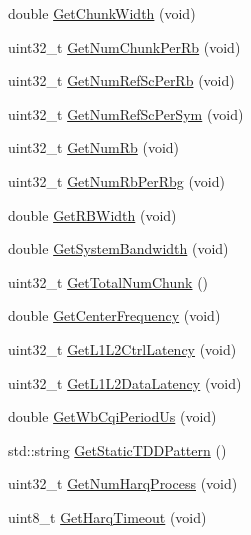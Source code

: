 \begin{DoxyCompactItemize}
\item 
double \hyperlink{classns3_1_1MmWavePhyMacCommon_acc801566d527f1893d67a618ea3be203}{Get\+Chunk\+Width} (void)
\item 
uint32\+\_\+t \hyperlink{classns3_1_1MmWavePhyMacCommon_a8a303f463053dadea5902859a00d481f}{Get\+Num\+Chunk\+Per\+Rb} (void)
\item 
uint32\+\_\+t \hyperlink{classns3_1_1MmWavePhyMacCommon_a4fd4de9347e0cb0384ff793195bf63bd}{Get\+Num\+Ref\+Sc\+Per\+Rb} (void)
\item 
uint32\+\_\+t \hyperlink{classns3_1_1MmWavePhyMacCommon_a4255231004e45cc9b3df0ceb791353db}{Get\+Num\+Ref\+Sc\+Per\+Sym} (void)
\item 
uint32\+\_\+t \hyperlink{classns3_1_1MmWavePhyMacCommon_a4c5f323fd722d6eec52efda5d76f97ad}{Get\+Num\+Rb} (void)
\item 
uint32\+\_\+t \hyperlink{classns3_1_1MmWavePhyMacCommon_a765574aedfb4a53b9be7de93ccb306e6}{Get\+Num\+Rb\+Per\+Rbg} (void)
\item 
double \hyperlink{classns3_1_1MmWavePhyMacCommon_a72cb93104f766b0a35298f5c0e93834b}{Get\+R\+B\+Width} (void)
\item 
double \hyperlink{classns3_1_1MmWavePhyMacCommon_a8a0b7aa68fc805eb3e8cbdc289fde04c}{Get\+System\+Bandwidth} (void)
\item 
uint32\+\_\+t \hyperlink{classns3_1_1MmWavePhyMacCommon_a97e82c809a351fea9d5058ac1bb4c3c6}{Get\+Total\+Num\+Chunk} ()
\item 
double \hyperlink{classns3_1_1MmWavePhyMacCommon_a0850d2e37c7075b9bce242723b722019}{Get\+Center\+Frequency} (void)
\item 
uint32\+\_\+t \hyperlink{classns3_1_1MmWavePhyMacCommon_a15d8a9077e0cc01988071eb3abe1f3de}{Get\+L1\+L2\+Ctrl\+Latency} (void)
\item 
uint32\+\_\+t \hyperlink{classns3_1_1MmWavePhyMacCommon_a9b99e1c2c35f28952b6196e22db18740}{Get\+L1\+L2\+Data\+Latency} (void)
\item 
double \hyperlink{classns3_1_1MmWavePhyMacCommon_aa792fa2dc8e159344f7f3e5a4f6195c5}{Get\+Wb\+Cqi\+Period\+Us} (void)
\item 
std\+::string \hyperlink{classns3_1_1MmWavePhyMacCommon_a01415b9e77e40b8d47e42ca80b667326}{Get\+Static\+T\+D\+D\+Pattern} ()
\item 
uint32\+\_\+t \hyperlink{classns3_1_1MmWavePhyMacCommon_a40773d84172ebeb5aff125f56ebcc5ac}{Get\+Num\+Harq\+Process} (void)
\item 
uint8\+\_\+t \hyperlink{classns3_1_1MmWavePhyMacCommon_a6a3b10cda74091e0579e24e3b4dbad80}{Get\+Harq\+Timeout} (void)

\end{DoxyCompactItemize}

